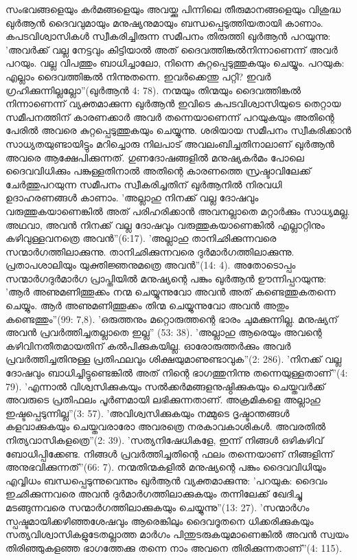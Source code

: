 സംഭവങ്ങളെയും കര്‍മങ്ങളെയും അവയ്ക്കു പിന്നിലെ തീരുമാനങ്ങളെയും വിശുദ്ധ ഖുര്‍ആന്‍ ദൈവവുമായും മനുഷ്യനുമായും ബന്ധപ്പെടുത്തിയതായി കാണാം. കപടവിശ്വാസികള്‍ സ്വീകരിച്ചിരുന്ന സമീപനം തിരുത്തി ഖുര്‍ആന്‍ പറയുന്നു: 'അവര്‍ക്ക് വല്ല നേട്ടവും കിട്ടിയാല്‍ അത് ദൈവത്തിങ്കല്‍നിന്നാണെന്ന് അവര്‍ പറയും. വല്ല വിപത്തും ബാധിച്ചാലോ, നിന്നെ കുറ്റപ്പെടുത്തുകയും ചെയ്യും. പറയുക: എല്ലാം ദൈവത്തിങ്കല്‍ നിന്നുതന്നെ. ഇവര്‍ക്കെന്തു പറ്റി? ഇവര്‍ ഗ്രഹിക്കുന്നില്ലല്ലോ''(ഖുര്‍ആന്‍ 4: 78).
നന്മയും തിന്മയും ദൈവത്തിങ്കല്‍ നിന്നാണെന്ന് വ്യക്തമാക്കുന്ന ഖുര്‍ആന്‍ ഇവിടെ കപടവിശ്വാസിയുടെ തെറ്റായ സമീപനത്തിന് കാരണക്കാര്‍ അവര്‍ തന്നെയാണെന്ന് പറയുകയും അതിന്റെ പേരില്‍ അവരെ കുറ്റപ്പെടുത്തുകയും ചെയ്യുന്നു. ശരിയായ സമീപനം സ്വീകരിക്കാന്‍ സാധ്യതയുണ്ടായിട്ടും മറിച്ചൊരു നിലപാട് അവലംബിച്ചതിനാലാണ് ഖുര്‍ആന്‍ അവരെ ആക്ഷേപിക്കുന്നത്.
ഗുണദോഷങ്ങളില്‍ മനുഷ്യകര്‍മം പോലെ ദൈവവിധിക്കും പങ്കുള്ളതിനാല്‍ അതിന്റെ കാരണത്തെ സ്രഷ്ടാവിലേക്ക് ചേര്‍ത്തുപറയുന്ന സമീപനം സ്വീകരിച്ചതിന് ഖുര്‍ആനില്‍ നിരവധി ഉദാഹരണങ്ങള്‍ കാണാം.
'അല്ലാഹു നിനക്ക് വല്ല ദോഷവും വരുത്തുകയാണെങ്കില്‍ അത് പരിഹരിക്കാന്‍ അവനല്ലാതെ മറ്റാര്‍ക്കും സാധ്യമല്ല. അഥവാ, അവന്‍ നിനക്ക് വല്ല ദോഷവും വരുത്തുകയാണെങ്കില്‍ എല്ലാറ്റിനും കഴിവുള്ളവനത്രെ അവന്‍''(6:17). 'അല്ലാഹു താനിഛിക്കുന്നവരെ സന്മാര്‍ഗത്തിലാക്കുന്നു. താനിഛിക്കുന്നവരെ ദുര്‍മാര്‍ഗത്തിലാക്കുന്നു. പ്രതാപശാലിയും യുക്തിജ്ഞനുമത്രെ അവന്‍''(14: 4).
അതോടൊപ്പം സന്മാര്‍ഗദുര്‍മാര്‍ഗ പ്രാപ്തിയില്‍ മനുഷ്യന്റെ പങ്കും ഖുര്‍ആന്‍ ഊന്നിപ്പറയുന്നു: 'ആര്‍ അണുമണിത്തൂക്കം നന്മ ചെയ്യുന്നുവോ അവന്‍ അത് കണ്ടെത്തുകതന്നെ ചെയ്യും. ആര്‍ അണുമണിത്തൂക്കം തിന്മ ചെയ്യുന്നുവോ അവന്‍ അതും കണ്ടെത്തും''(99: 7,8). 'ഒരുത്തനും മറ്റൊരുത്തന്റെ ഭാരം ചുമക്കുന്നില്ല. മനുഷ്യന് അവന്‍ പ്രവര്‍ത്തിച്ചതല്ലാതെ ഇല്ല'' (53: 38). 'അല്ലാഹു ആരെയും അവന്റെ കഴിവിനതീതമായതിന് കല്‍പിക്കുകയില്ല. ഓരോരുത്തര്‍ക്കും അവര്‍ പ്രവര്‍ത്തിച്ചതിനുള്ള പ്രതിഫലവും ശിക്ഷയുമാണുണ്ടാവുക''(2: 286). 'നിനക്ക് വല്ല ദോഷവും ബാധിച്ചിട്ടുണ്ടെങ്കില്‍ അത് നിന്റെ ഭാഗത്തുനിന്നു തന്നെയുള്ളതാണ്''(4: 79). 'എന്നാല്‍ വിശ്വസിക്കുകയും സല്‍ക്കര്‍മങ്ങളനുഷ്ഠിക്കുകയും ചെയ്തവര്‍ക്ക് അവരുടെ പ്രതിഫലം പൂര്‍ണമായി ലഭിക്കുന്നതാണ്. അക്രമികളെ അല്ലാഹു ഇഷ്ടപ്പെടുന്നില്ല''(3: 57). 'അവിശ്വസിക്കുകയും നമ്മുടെ ദൃഷ്ടാന്തങ്ങള്‍ കളവാക്കുകയും ചെയ്തവരാരോ അവരത്രെ നരകാവകാശികള്‍. അവരതില്‍ നിത്യവാസികളത്രെ''(2: 39). 'സത്യനിഷേധികളേ, ഇന്ന് നിങ്ങള്‍ ഒഴികഴിവ് ബോധിപ്പിക്കേണ്ട. നിങ്ങള്‍ പ്രവര്‍ത്തിച്ചതിന്റെ ഫലം തന്നെയാണ് നിങ്ങളിന്ന് അനുഭവിക്കുന്നത്''(66: 7).
നന്മതിന്മകളില്‍ മനുഷ്യന്റെ പങ്കും ദൈവവിധിയും എവ്വിധം ബന്ധപ്പെടുന്നുവെന്നും ഖുര്‍ആന്‍ വ്യക്തമാക്കുന്നു: 'പറയുക: ദൈവം ഇഛിക്കുന്നവരെ അവന്‍ ദുര്‍മാര്‍ഗത്തിലാക്കുകയും തന്നിലേക്ക് ഖേദിച്ചു മടങ്ങുന്നവരെ സന്മാര്‍ഗത്തിലാക്കുകയും ചെയ്യുന്നു''(13: 27). 'സന്മാര്‍ഗം സ്പഷ്ടമായിക്കഴിഞ്ഞശേഷവും ആരെങ്കിലും ദൈവദൂതനെ ധിക്കരിക്കുകയും സത്യവിശ്വാസികളുടേതല്ലാത്ത മാര്‍ഗം പിന്തുടരുകയുമാണെങ്കില്‍ അവന്‍ സ്വയം തിരിഞ്ഞുകളഞ്ഞ ഭാഗത്തേക്കു തന്നെ നാം അവനെ തിരിക്കുന്നതാണ്''(4: 115).
